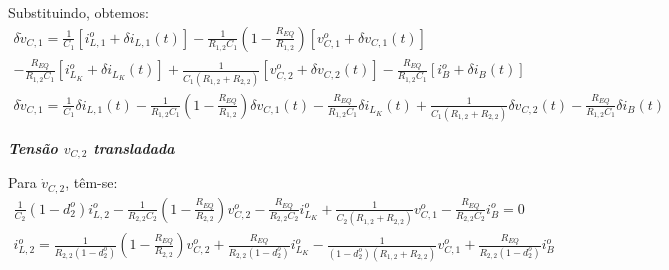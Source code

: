 Substituindo, obtemos:
\begin{multline*}
  \delta \dot v_{C,1} = \frac{1}{C_1} \left[i_{L,1}^o + \delta i_{L,1}(t)\right]
  - \frac{1}{R_{1,2}C_1} \left(1 - \frac{R_{EQ}}{{R_{1,2}}}\right) \left[v_{C,1}^o + \delta v_{C,1}(t)\right] \\
  - \frac{R_{EQ}}{R_{1,2} C_1} \left[i_{L_K}^o + \delta i_{L_K}(t)\right]
  + \frac{1}{C_1 (R_{1,2} + R_{2,2})} \left[v_{C,2}^o + \delta v_{C,2}(t) \right]
  - \frac{R_{EQ}}{R_{1,2} C_1} \left[i_B^o + \delta i_B(t)\right]
\end{multline*}
\begin{gather}
  \delta \dot v_{C,1} = \frac{1}{C_1} \delta i_{L,1}(t)
  - \frac{1}{R_{1,2}C_1} \left(1 - \frac{R_{EQ}}{{R_{1,2}}}\right) \delta v_{C,1}(t)
  - \frac{R_{EQ}}{R_{1,2} C_1} \delta i_{L_K}(t)
  + \frac{1}{C_1 (R_{1,2} + R_{2,2})} \delta v_{C,2}(t)
  - \frac{R_{EQ}}{R_{1,2} C_1} \delta i_B(t)
\end{gather}

\textbf{\textit{Tensão $v_{C,2}$ transladada}} \vspace*{12pt}

Para $\dot{v}_{C,2}$, têm-se:
\begin{gather*}
  \frac{1}{C_2} \left(1 - d_2^o\right) i_{L,2}^o - \frac{1}{R_{2,2}C_2} \left(1 - \frac{R_{EQ}}{R_{2,2}}\right) v_{C,2}^o - \frac{R_{EQ}}{R_{2,2} C_2} i_{L_K}^o + \frac{1}{C_2(R_{1,2} + R_{2,2})} v_{C,1}^o - \frac{R_{EQ}}{R_{2,2}C_2} i_B^o= 0
\end{gather*}
\begin{gather}
  i_{L,2}^o = \frac{1}{R_{2,2} \left(1 - d_2^o\right)} \left(1 - \frac{R_{EQ}}{R_{2,2}}\right) v_{C,2}^o + \frac{R_{EQ}}{R_{2,2} \left(1 - d_2^o\right)} i_{L_K}^o - \frac{1}{\left(1 - d_2^o\right) (R_{1,2} + R_{2,2})} v_{C,1}^o + \frac{R_{EQ}}{R_{2,2}\left(1 - d_2^o\right)} i_B^o
\end{gather}

